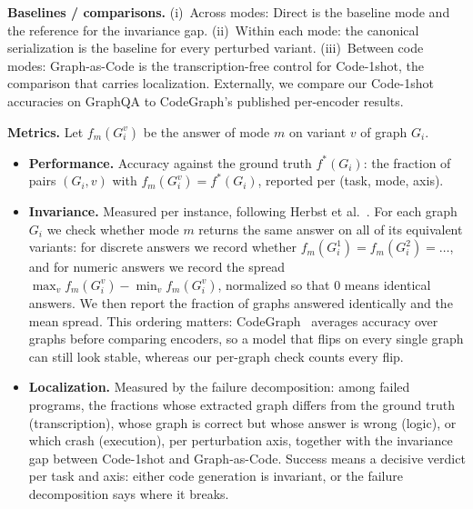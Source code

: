 \documentclass[10pt,a4paper]{article}
\newcommand{\head}[1]{\vspace{0.35em}\noindent\textbf{#1}\hspace{0.5em}}
\begin{document}
\head{Baselines / comparisons.} (i)~Across modes: Direct is the baseline mode and the reference for the invariance gap. (ii)~Within each mode: the canonical serialization is the baseline for every perturbed variant. (iii)~Between code modes: Graph-as-Code is the transcription-free control for Code-1shot, the comparison that carries localization. Externally, we compare our Code-1shot accuracies on GraphQA to CodeGraph's published per-encoder results.

\head{Metrics.} Let $f_m(G_i^v)$ be the answer of mode $m$ on variant $v$ of graph $G_i$.

\begin{itemize}[label={},leftmargin=1.6em]
\item \textbf{Performance.} Accuracy against the ground truth $f^*(G_i)$: the fraction of pairs $(G_i,v)$ with $f_m(G_i^v)=f^*(G_i)$, reported per (task, mode, axis).
\item \textbf{Invariance.} Measured per instance, following Herbst et al.~\cite{herbst}. For each graph $G_i$ we check whether mode $m$ returns the same answer on all of its equivalent variants: for discrete answers we record whether $f_m(G_i^1)=f_m(G_i^2)=\dots$, and for numeric answers we record the spread $\max_v f_m(G_i^v)-\min_v f_m(G_i^v)$, normalized so that 0 means identical answers. We then report the fraction of graphs answered identically and the mean spread. This ordering matters: CodeGraph~\cite{cai} averages accuracy over graphs before comparing encoders, so a model that flips on every single graph can still look stable, whereas our per-graph check counts every flip.
\item \textbf{Localization.} Measured by the failure decomposition: among failed programs, the fractions whose extracted graph differs from the ground truth (transcription), whose graph is correct but whose answer is wrong (logic), or which crash (execution), per perturbation axis, together with the invariance gap between Code-1shot and Graph-as-Code. Success means a decisive verdict per task and axis: either code generation is invariant, or the failure decomposition says where it breaks.
\end{itemize}

\begingroup
\footnotesize


\endgroup
\end{document}
